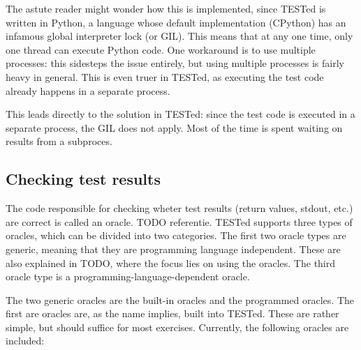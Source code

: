 \documentclass[../main]{subfiles}
\begin{document}
The astute reader might wonder how this is implemented, since TESTed is written in Python, a language whose default implementation (CPython) has an infamous global interpreter lock (or GIL).
This means that at any one time, only one thread can execute Python code.
One workaround is to use multiple processes: this sidesteps the issue entirely, but using multiple processes is fairly heavy in general.
This is even truer in TESTed, as executing the test code already happens in a separate process.

This leads directly to the solution in TESTed: since the test code is executed in a separate process, the GIL does not apply.
Most of the time is spent waiting on results from a subproces.

\subsection{Checking test results}\label{subsec:checking-results}

The code responsible for checking wheter test results (return values, stdout, etc.) are correct is called an oracle. TODO referentie.
TESTed supports three types of oracles, which can be divided into two categories.
The first two oracle types are generic, meaning that they are programming language independent.
These are also explained in TODO, where the focus lies on using the oracles.
The third oracle type is a programming-language-dependent oracle.

The two generic oracles are the built-in oracles and the programmed oracles.
The first are oracles are, as the name implies, built into TESTed.
These are rather simple, but should suffice for most exercises.
Currently, the following oracles are included:
\end{document}
